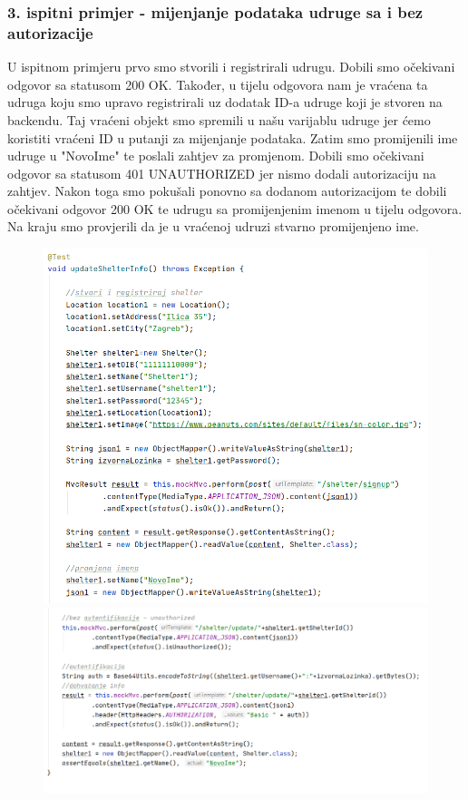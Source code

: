 			
			
			\subsubsection{3. ispitni primjer - mijenjanje podataka udruge sa i bez autorizacije }
			
			U ispitnom primjeru prvo smo stvorili i registrirali  udrugu. Dobili smo očekivani odgovor sa statusom 200 OK. Također, u tijelu odgovora nam je vraćena ta udruga koju smo upravo registrirali uz dodatak ID-a udruge koji je stvoren na backendu. Taj vraćeni objekt smo spremili u našu varijablu udruge jer ćemo koristiti vraćeni ID u putanji za mijenjanje podataka. Zatim smo promijenili ime udruge u "NovoIme" te poslali zahtjev za promjenom. Dobili smo očekivani odgovor sa statusom 401 UNAUTHORIZED jer nismo dodali autorizaciju na zahtjev. Nakon toga smo pokušali ponovno sa dodanom autorizacijom te dobili očekivani odgovor 200 OK te udrugu sa promijenjenim imenom u tijelu odgovora. Na kraju smo provjerili da je u vraćenoj udruzi stvarno promijenjeno ime.
			
			\begin{figure}[H]
				\hspace*{-0.5in}
				\includegraphics[scale=0.73]{slike/shelter3.1.PNG}
				\hspace*{-0.45in}	
				\includegraphics[scale=0.73]{slike/shelter3.2.PNG} %
				\centering
			\end{figure}
			
